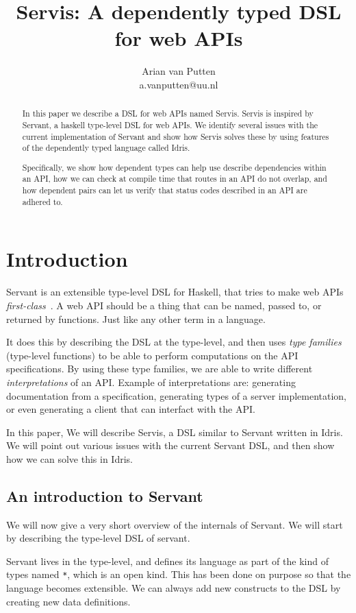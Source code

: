 \documentclass[12pt,a4paper]{article}
\author{Arian van Putten \\ a.vanputten@uu.nl}
\title{Servis: A dependently typed DSL for web APIs}
\begin{document}
\maketitle
\begin{abstract}
In this paper we describe a DSL for web APIs named Servis. Servis is  inspired by Servant, a haskell type-level DSL for web APIs. We identify several issues with the current implementation of Servant and show how Servis solves these by using features of the dependently typed language called Idris.

Specifically, we show how dependent types can help use describe dependencies within an API, how we can check at  compile time that routes in an API do not overlap, and how dependent pairs can let us verify that status codes described in an API are adhered to.

\end{abstract}

\section{Introduction}
Servant is an extensible type-level DSL for Haskell, that tries to make web APIs \emph{first-class}~\cite{servant}. A web API should be a thing that can be named, passed to, or returned by functions. Just like any other term in a language.

It does this by describing the DSL at the type-level, and then uses \emph{type families} (type-level functions) to be able to perform computations on the API specifications.  By using these type families, we are able to write different \emph{interpretations} of an API\@.  Example of interpretations are: generating documentation from a specification, generating types of a server implementation, or even generating a client that can interfact with the API\@.

In this paper, We will describe Servis, a DSL  similar to  Servant written in Idris. We will point out various issues with the current Servant DSL,
and then show how we can solve this in Idris.

\subsection{An introduction to Servant}
\label{sec:servant_intro}
We will now give a very short overview of the internals of Servant. We will start by describing the type-level DSL of servant.

Servant lives in the type-level, and defines its language as part of the kind of types named \texttt{*}, which is an open kind. This has been done on purpose so that the language becomes extensible. We can always add new constructs to the DSL by creating new data definitions.
\end{document}
